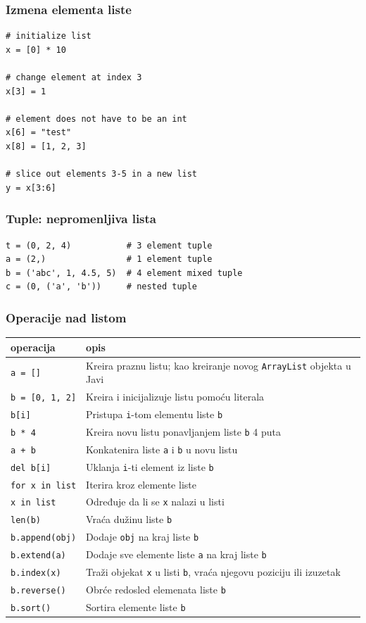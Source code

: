\documentclass[compress]{beamer}
\begin{document}
\begin{frame}[fragile]
\frametitle{Izmena elementa liste}
\begin{verbatim}
# initialize list
x = [0] * 10

# change element at index 3
x[3] = 1

# element does not have to be an int
x[6] = "test"
x[8] = [1, 2, 3]

# slice out elements 3-5 in a new list
y = x[3:6]
\end{verbatim}
\end{frame}

\begin{frame}[fragile]
\frametitle{Tuple: nepromenljiva lista}
\begin{verbatim}
t = (0, 2, 4)           # 3 element tuple
a = (2,)                # 1 element tuple
b = ('abc', 1, 4.5, 5)  # 4 element mixed tuple
c = (0, ('a', 'b'))     # nested tuple
\end{verbatim}
\end{frame}

\begin{frame}[fragile]
\frametitle{Operacije nad listom}
\small
\begin{tabular}{lp{8cm}}
  \textbf{operacija} & \textbf{opis} \\ \hline
  \texttt{a = []}        & Kreira praznu listu; kao kreiranje novog \texttt{ArrayList} objekta u Javi \\ \hline
  \texttt{b = [0, 1, 2]} & Kreira i inicijalizuje listu pomoću literala \\ \hline
  \texttt{b[i]}          & Pristupa \texttt{i}-tom elementu liste \texttt{b} \\ \hline
  \texttt{b * 4}         & Kreira novu listu ponavljanjem liste \texttt{b} 4 puta \\ \hline
  \texttt{a + b}         & Konkatenira liste \texttt{a} i \texttt{b} u novu listu \\ \hline
  \texttt{del b[i]}      & Uklanja \texttt{i}-ti element iz liste \texttt{b} \\ \hline
  \texttt{for x in list} & Iterira kroz elemente liste \\ \hline
  \texttt{x in list}     & Određuje da li se \texttt{x} nalazi u listi \\ \hline
  \texttt{len(b)}        & Vraća dužinu liste \texttt{b} \\ \hline
  \texttt{b.append(obj)} & Dodaje \texttt{obj} na kraj liste \texttt{b} \\ \hline
  \texttt{b.extend(a)}   & Dodaje sve elemente liste \texttt{a} na kraj liste \texttt{b} \\ \hline
  \texttt{b.index(x)}    & Traži objekat \texttt{x} u listi \texttt{b}, vraća njegovu poziciju ili izuzetak \\ \hline
  \texttt{b.reverse()}   & Obrće redosled elemenata liste \texttt{b} \\ \hline
  \texttt{b.sort()}      & Sortira elemente liste \texttt{b}
\end{tabular}
\end{frame}
\end{document}
